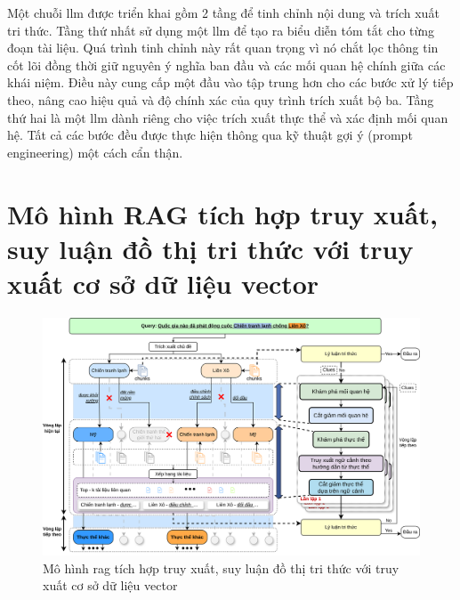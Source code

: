 Một chuỗi \gls{llm} được triển khai gồm 2 tầng để tinh chỉnh nội dung và trích xuất tri thức. Tầng thứ nhất sử dụng một \gls{llm} để tạo ra biểu diễn tóm tắt cho từng đoạn tài liệu. Quá trình tinh chỉnh này rất quan trọng vì nó chắt lọc thông tin cốt lõi đồng thời giữ nguyên ý nghĩa ban đầu và các mối quan hệ chính giữa các khái niệm. Điều này cung cấp một đầu vào tập trung hơn cho các bước xử lý tiếp theo, nâng cao hiệu quả và độ chính xác của quy trình trích xuất bộ ba. Tầng thứ hai là một \gls{llm} dành riêng cho việc trích xuất thực thể và xác định mối quan hệ. Tất cả các bước đều được thực hiện thông qua kỹ thuật gợi ý (prompt engineering) một cách cẩn thận.
\section{Mô hình RAG tích hợp truy xuất, suy luận đồ thị tri thức với truy xuất cơ sở dữ liệu vector}
\label{section:rag_integrated_knowledge_graph}
\begin{figure}
    \centering
    \includegraphics[width=1\textwidth]{Chapter3/Fig/pipeline.png}
    \caption{Mô hình \gls{rag} tích hợp truy xuất, suy luận đồ thị tri thức với truy xuất cơ sở dữ liệu vector}
    \label{fig:proposed_method}
\end{figure}


